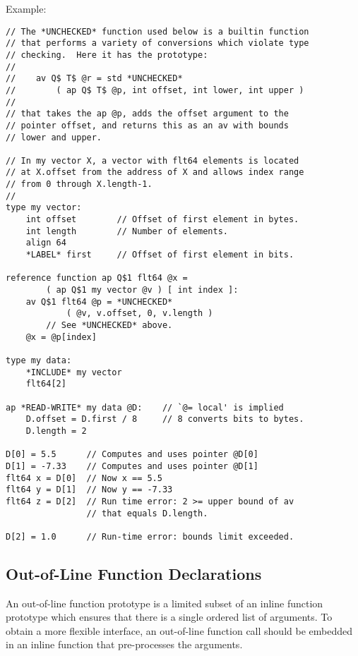 \documentclass[12pt]{article}
\newenvironment{indpar}[1][0.3in]%
	{\begin{list}{}%
		     {\setlength{\itemsep}{0in}%
		      \setlength{\topsep}{0in}%
		      \setlength{\parsep}{1ex}%
		      \setlength{\labelwidth}{#1}%
		      \setlength{\leftmargin}{#1}%
		      \addtolength{\leftmargin}{\labelsep}}%
	 \item}%
	{\end{list}}
\begin{document}
Example:

\begin{indpar}\label{REFERENCE-FUNCTION-EXAMPLE}\begin{verbatim}
// The *UNCHECKED* function used below is a builtin function
// that performs a variety of conversions which violate type
// checking.  Here it has the prototype:
//
//    av Q$ T$ @r = std *UNCHECKED*
//        ( ap Q$ T$ @p, int offset, int lower, int upper )
//
// that takes the ap @p, adds the offset argument to the
// pointer offset, and returns this as an av with bounds
// lower and upper.

// In my vector X, a vector with flt64 elements is located
// at X.offset from the address of X and allows index range
// from 0 through X.length-1.
//
type my vector:
    int offset        // Offset of first element in bytes.
    int length        // Number of elements.
    align 64
    *LABEL* first     // Offset of first element in bits.

reference function ap Q$1 flt64 @x =
        ( ap Q$1 my vector @v ) [ int index ]:
    av Q$1 flt64 @p = *UNCHECKED*
            ( @v, v.offset, 0, v.length )
        // See *UNCHECKED* above.
    @x = @p[index]

type my data:
    *INCLUDE* my vector
    flt64[2]

ap *READ-WRITE* my data @D:    // `@= local' is implied
    D.offset = D.first / 8     // 8 converts bits to bytes.
    D.length = 2

D[0] = 5.5      // Computes and uses pointer @D[0]
D[1] = -7.33    // Computes and uses pointer @D[1]
flt64 x = D[0]  // Now x == 5.5
flt64 y = D[1]  // Now y == -7.33
flt64 z = D[2]  // Run time error: 2 >= upper bound of av
                // that equals D.length.

D[2] = 1.0      // Run-time error: bounds limit exceeded.
\end{verbatim}\end{indpar}


\subsection{Out-of-Line Function Declarations}
\label{OUT-OF-LINE-FUNCTION-DECLARATIONS}

An out-of-line function prototype is a limited subset of
an inline function prototype which ensures that there is
a single ordered list of arguments.  To obtain a more
flexible interface, an out-of-line function call should
be embedded in an inline function that pre-processes the
arguments.
\end{document}

